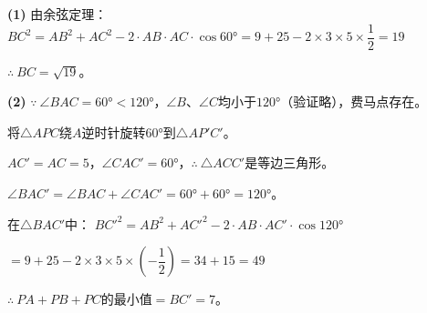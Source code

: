 \documentclass[12pt, a4paper]{ctexart}
\begin{document}
\begin{proofbox}[【题6】详解]
\textbf{(1)} 由余弦定理：
$BC^2 = AB^2 + AC^2 - 2 \cdot AB \cdot AC \cdot \cos 60° = 9 + 25 - 2 \times 3 \times 5 \times \dfrac{1}{2} = 19$

$\therefore\ BC = \boxed{\sqrt{19}}$。

\textbf{(2)} $\because\ \angle BAC = 60° < 120°$，$\angle B$、$\angle C$均小于$120°$（验证略），费马点存在。

将$\triangle APC$绕$A$逆时针旋转$60°$到$\triangle AP'C'$。

$AC' = AC = 5$，$\angle CAC' = 60°$，$\therefore\ \triangle ACC'$是等边三角形。

$\angle BAC' = \angle BAC + \angle CAC' = 60° + 60° = 120°$。

在$\triangle BAC'$中：
$BC'^2 = AB^2 + AC'^2 - 2 \cdot AB \cdot AC' \cdot \cos 120°$

$= 9 + 25 - 2 \times 3 \times 5 \times \left(-\dfrac{1}{2}\right) = 34 + 15 = 49$

$\therefore\ PA + PB + PC$的最小值$= BC' = \boxed{7}$。
\end{proofbox}
\end{document}
